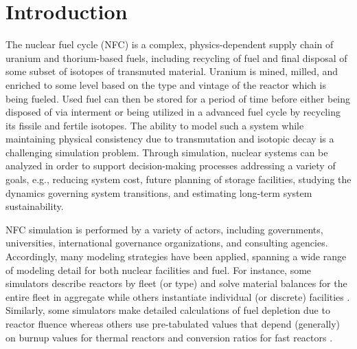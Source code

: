 \section{Introduction}

The nuclear fuel cycle (NFC) is a complex, physics-dependent supply chain of
uranium and thorium-based fuels, including recycling of fuel and final disposal
of some subset of isotopes of transmuted material. Uranium is mined, milled, and
enriched to some level based on the type and vintage of the reactor
which is being fueled. Used fuel can then be stored for a period of time before
either being disposed of via interment or being utilized in a advanced fuel cycle by
recycling its fissile and fertile isotopes. The ability to model such a system
while maintaining physical consistency due to transmutation and isotopic decay
is a challenging simulation problem. Through simulation, nuclear systems can be
analyzed in order to support decision-making processes addressing a variety of
goals, e.g., reducing system cost, future planning of storage facilities,
studying the dynamics governing system transitions, and estimating long-term
system sustainability.

NFC simulation is performed by a variety of actors, including governments,
universities, international governance organizations, and consulting
agencies. Accordingly, many modeling strategies have been applied, spanning a
wide range of modeling detail for both nuclear facilities and fuel. For
instance, some simulators describe reactors by fleet (or type) and solve
material balances for the entire fleet in aggregate
\cite{busquim_e_silva_system_2008, durpel_daness_2003, yacout_vision_2006} while
others instantiate individual (or discrete) facilities
\cite{schneider_nfcsim:_2005}. Similarly, some simulators make detailed
calculations of fuel depletion due to reactor fluence \cite{boucher_cosi:_2006,
  mouginot2012class} whereas others use pre-tabulated values that depend
(generally) on burnup values for thermal reactors and conversion ratios for fast
reactors \cite{yacout_vision_2006}.


